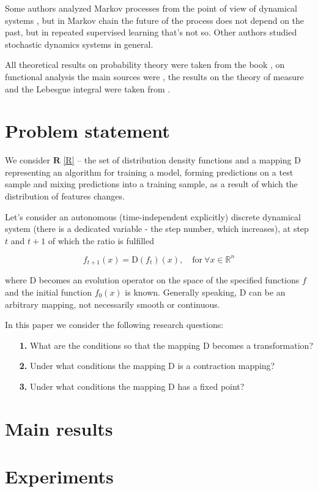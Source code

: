 \documentclass{article}
\begin{document}
    Some authors analyzed Markov processes from the point of view of dynamical systems \cite{tarlowski2017global, vershik2005does}, but in Markov chain the future of the process does not depend on the past, but in repeated supervised learning that's not so. Other authors \cite{varvenne2019rate, pap1996fixed} studied stochastic dynamics systems in general.

    All theoretical results on probability theory were taken from the book \cite{shiryaev2016probability}, on functional analysis the main sources were \cite{kolmogorov1957elements, rudin1991functional}, the results on the theory of measure and the Lebesgue integral were taken from \cite{rudin2006real}.

\section{Problem statement} \label{Problem_statement}

    We consider $\mathbf{R}$ \eqref{R} -- the set of distribution density functions and a mapping $\text{D}$ representing an algorithm for training a model, forming predictions on a test sample and mixing predictions into a training sample, as a result of which the distribution of features changes.

    Let's consider an autonomous (time-independent explicitly) discrete dynamical system (there is a dedicated variable - the step number, which increases), at step $t$ and $t+1$ of which the ratio is fulfilled

    \begin{equation*}
        f_{t+1}(x) = \text{D}(f_t)(x), \quad \text{for}~ \forall x \in \mathbb{R}^n
    \end{equation*}

    where $\text{D}$ becomes an evolution operator on the space of the specified functions $f$ and the initial function $f_0(x)$ is known. Generally speaking, $\text{D}$ can be an arbitrary mapping, not necessarily smooth or continuous.

    In this paper we consider the following research questions:

    \begin{enumerate}
        \item[\textbf{1.}]  What are the conditions so that the mapping $\text{D}$ becomes a transformation? 

        \item[\textbf{2.}] Under what conditions the mapping $\text{D}$ is  a contraction mapping?

        \item[\textbf{3.}] Under what conditions the mapping $\text{D}$ has a fixed point?
    \end{enumerate}


\section{Main results} \label{Main_results}

\section{Experiments} \label{Experiments}


  
\end{document}
